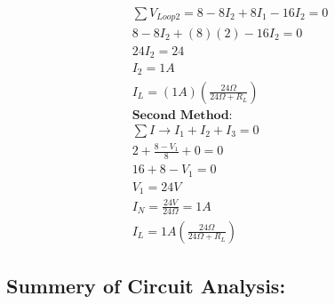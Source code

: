 \documentclass[a4paper,12]{article}
\begin{document}
\begin{gather}
    \sum V_{Loop 2}=8-8I_2+8I_1-16I_2=0\\
    8-8I_2+(8)(2)-16I_2=0\\
    24I_{2}=24\\
    I_2=1A\\
    I_L=(1A)(\frac{24\Omega}{24\Omega+R_L})\\
    \textbf{Second Method:}\\
    \sum I \rightarrow I_1+I_2+I_3=0\\
    2+\frac{8-V_1}{8}+0=0\\
    16+8-V_1=0\\
    V_1=24V\\
    I_N=\frac{24V}{24\Omega}=1A\\
    I_L=1A(\frac{24\Omega}{24\Omega +R_L})
\end{gather}
\subsection{Summery of Circuit Analysis:}
\end{document}
